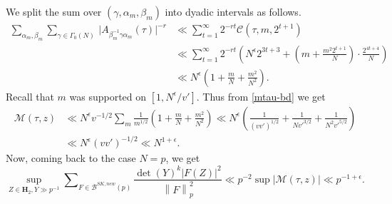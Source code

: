 \documentclass[11pt]{amsart}
\numberwithin{equation}{section}
\theoremstyle{plain}
\theoremstyle{definition}
\newcommand{\mf}{\mathbf}
\newcommand{\mc}{\mathcal}
\newcommand*{\norm}[1]{\left\lVert#1\right\rVert}
\newcommand{\sumn}{\sum \nolimits}
\begin{document}
We split the sum over $(\gamma, \alpha_m, \beta_m)$ into dyadic intervals as follows.
\begin{equation}
\begin{split}
    \sum_{\alpha_m, \beta_m}\sum_{ \gamma\in \Gamma_0(N)} \, \big |A_{\beta_m^{-1} \gamma \alpha_m}(\tau)|^{-r} &\ll \sum_{t=1}^{\infty} 2^{-rt} \mc C(\tau, m, 2^{t+1})\\
    & \ll \sum_{t=1}^{\infty} 2^{-rt}\left(N^\epsilon 2^{3t+3} + \left(m + \frac{m^2 2^{t+1}}{N}\right) \cdot \frac{2^{4t+4}}{N}\right)\\
    &\ll N^\epsilon\left(1+\frac{m}{N}+\frac{m^2}{N^2}\right).
\end{split}
\end{equation}
Recall that $m$ was supported on $[1, N^\epsilon/v']$. Thus from \eqref{mtau-bd} we get
\begin{equation}
\begin{split}
    \mc M(\tau, z)&\ll  N^\epsilon v^{-1/2} \sum_m  \frac{1}{m^{1/2}}\left(1+\frac{m}{N}+\frac{m^2}{N^2}\right)\ll N^\epsilon \left( \frac{1}{(vv')^{1/2}} + \frac{1}{Nv'^{3/2}}+\frac{1}{N^2v'^{5/2}}\right)\\
    &\ll N^{\epsilon}(vv')^{-1/2}\ll N^{1+\epsilon}.
\end{split}
\end{equation}
Now, coming back to the case $N=p$, we get
\begin{equation}
    \sup_{Z \in \mf H_2, Y \gg p^{-1}}\sumn_{F \in \mc B^{SK, new}(p)}  \frac{\det(Y)^k |F(Z)|^2}{\norm{F}^2_p} \ll p^{-2} \sup |\mc M(\tau, z)| \ll p^{-1+\epsilon} .
\end{equation}
\end{document}
